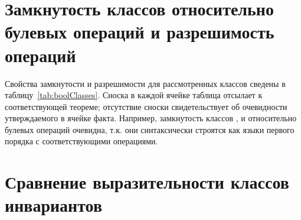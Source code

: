 \section{Замкнутость классов относительно булевых операций и разрешимость операций}\label{sec:comparison/boolean}

Свойства замкнутости и разрешимости для рассмотренных классов сведены в таблицу~\cref{tab:boolClasses}. Сноска в каждой ячейке таблица отсылает к соответствующей теореме; отсутствие сноски свидетельствует об очевидности утверждаемого в ячейке факта. Например, замкнутость классов \elemclass{}, \sizeelemclass{} и \regelemclass{} относительно булевых операций очевидна, т.\:к. они синтаксически строятся как языки первого порядка с соответствующими операциями.


\section{Сравнение выразительности классов инвариантов}\label{sec:comparison/expressivity}

